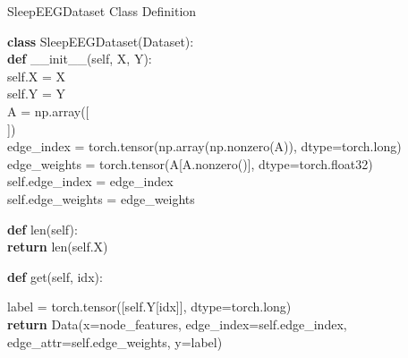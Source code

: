 \begin{algorithm*}[!t]
 	\caption{SleepEEGDataset Class Definition}
 	\label{alg:sleepdataset}
 	
 	
 	\textbf{class} SleepEEGDataset(Dataset): \\
 	\Indp
 	\textbf{def} \_\_init\_\_(self, X, Y): \\
 	\Indp
 	self.X = X \\
 	self.Y = Y \\
 	A = np.array([ \\
 	
 	]) \\
 	edge\_index = torch.tensor(np.array(np.nonzero(A)), dtype=torch.long) \\
 	edge\_weights = torch.tensor(A[A.nonzero()], dtype=torch.float32) \\
 	self.edge\_index = edge\_index \\
 	self.edge\_weights = edge\_weights \\
 	\Indm
 	
 	\BlankLine
 	
 	\textbf{def} len(self): \\
 	\Indp
 	\textbf{return} len(self.X) \\
 	\Indm
 	
 	\BlankLine
 	
 	\textbf{def} get(self, idx): \\
 	\Indp
 	
 	label = torch.tensor([self.Y[idx]], dtype=torch.long) \\
 	\textbf{return} Data(x=node\_features, edge\_index=self.edge\_index, \\
 	\hspace{6em}edge\_attr=self.edge\_weights, y=label) \\
 	\Indm
 \end{algorithm*}
 
 
 
 
 
 
 
 
 
 
 
